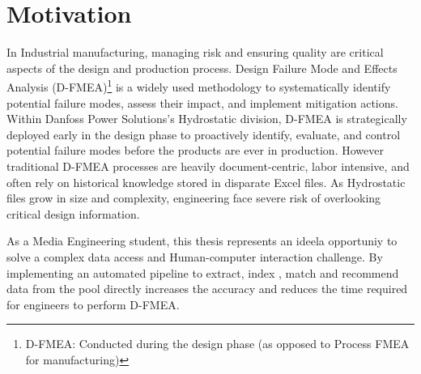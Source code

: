 
\section{Motivation}

In Industrial manufacturing, managing risk and ensuring quality are critical aspects of the design and production process. Design Failure Mode and Effects Analysis (D-FMEA)\footnote{D-FMEA: Conducted during the design phase (as opposed to Process FMEA for manufacturing)} is a widely used methodology to systematically identify potential failure modes, assess their impact, and implement mitigation actions. Within Danfoss Power Solutions's Hydrostatic division, D-FMEA is strategically deployed early in the design phase to proactively identify, evaluate, and control potential failure modes before the products are ever in production. However traditional D-FMEA processes are heavily document-centric, labor intensive, and often rely on historical knowledge stored in disparate Excel files. As Hydrostatic files grow in size and complexity, engineering face severe risk of overlooking critical design information. 

As a Media Engineering student, this thesis represents an ideela opportuniy to solve a complex data access and Human-computer interaction challenge. By implementing an automated pipeline to extract, index , match and recommend data from the pool directly increases the accuracy and reduces the time required for engineers to perform D-FMEA.